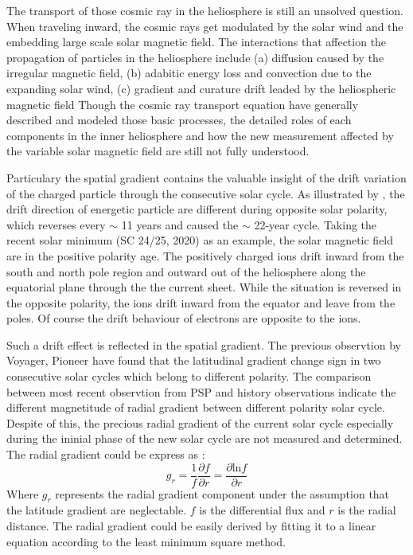 The transport of those cosmic ray in the heliosphere is still an unsolved question. When traveling inward, the cosmic rays get modulated by the solar wind and the embedding large scale solar magnetic field. The interactions that affection the propagation of particles in the heliosphere include (a) diffusion caused by the irregular magnetic field, (b) adabitic energy loss and convection due to the expanding solar wind,  (c) gradient and curature drift leaded by the heliospheric magnetic field
Though the cosmic ray transport equation have generally described and modeled those basic processes, the detailed roles of each components in the inner heliosphere and how the new measurement affected by the variable solar magnetic field are still not fully understood. \citep{Rankin2021ApJ}

Particulary the spatial gradient contains the valuable insight of the drift variation of the charged particle through the consecutive solar cycle. As illustrated by \citet{Jokipii1977ApJ, Jokipii1979ApJ, Potgieter2013LRSP}, the drift direction of energetic particle are different during opposite solar polarity, which reverses every $\sim$ 11 years and caused the $\sim$ 22-year cycle. Taking the recent solar minimum (\ac{SC} 24/25, 2020) as an example, the solar magnetic field are in the positive polarity age. The positively charged ions drift inward from the south and north pole region and outward out of the heliosphere along the equatorial plane through the the current sheet. While the situation is reversed in the opposite polarity, the ions drift inward from the equator and leave from the poles. Of course the drift behaviour of electrons are opposite to the ions.

Such a drift effect is reflected in the spatial gradient. The previous observtion by Voyager, Pioneer have found that the latitudinal gradient change sign in two consecutive solar cycles which belong to different polarity.
The comparison between most recent observtion from \ac{PSP} and history observations indicate the different magnetitude of radial gradient between different polarity solar cycle. Despite of this, the precious radial gradient of the current solar cycle especially during the ininial phase of the new solar cycle are not measured and determined.
The radial gradient could be express as \cite{Rankin2021ApJ} :
\begin{equation}
    g_r = \frac{1}{f}\frac{\partial{f}}{\partial{r}} = \frac{\partial{\mathrm{ln} f}}{\partial{r}}
\end{equation}
Where $g_r$ represents the radial gradient component under the assumption that the latitude gradient are neglectable. $f$ is the differential flux and $r$ is the radial distance. The radial gradient could be easily derived by fitting it to a linear equation according to the least minimum square method.


